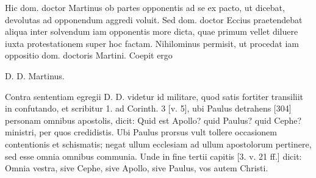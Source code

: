 Hic dom. doctor Martinus ob partes opponentis ad se ex pacto, ut dicebat, devolutas ad opponendum aggredi voluit. Sed dom. doctor Eccius praetendebat aliqua inter solvendum iam opponentis more dicta, quae primum vellet diluere iuxta protestationem super hoc factam. Nihilominus permisit, ut procedat iam oppositio dom. doctoris Martini. Coepit ergo

D. D. Martinus.

Contra sententiam egregii D. D. videtur id militare, quod satis fortiter transiliit in confutando, et scribitur 1. ad Corinth. 3 [v. 5], ubi Paulus detrahens [304] personam omnibus apostolis, dicit: Quid est Apollo? quid Paulus? quid Cephe? ministri, per quos credidistis. Ubi Paulus prorsus vult tollere occasionem contentionis et schismatis; negat ullum ecclesiam ad ullum apostolorum pertinere, sed esse omnia omnibus communia. Unde in fine tertii capitis [3. v. 21 ff.] dicit: Omnia vestra, sive Cephe, sive Apollo, sive Paulus, vos autem Christi.


